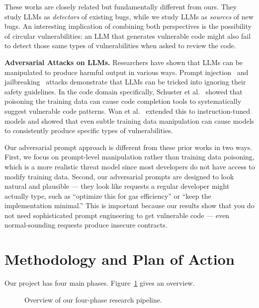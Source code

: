 \documentclass[11pt]{article}
\begin{document}
These works are closely related but fundamentally different from ours. They study LLMs as \emph{detectors} of existing bugs, while we study LLMs as \emph{sources} of new bugs. An interesting implication of combining both perspectives is the possibility of circular vulnerabilities: an LLM that generates vulnerable code might also fail to detect those same types of vulnerabilities when asked to review the code.

\textbf{Adversarial Attacks on LLMs.}
Researchers have shown that LLMs can be manipulated to produce harmful output in various ways. Prompt injection~\cite{perez2022ignore} and jailbreaking~\cite{kang2024exploiting} attacks demonstrate that LLMs can be tricked into ignoring their safety guidelines. In the code domain specifically, Schuster et al.~\cite{schuster2021you} showed that poisoning the training data can cause code completion tools to systematically suggest vulnerable code patterns. Wan et al.~\cite{wan2023poisoning} extended this to instruction-tuned models and showed that even subtle training data manipulation can cause models to consistently produce specific types of vulnerabilities.

Our adversarial prompt approach is different from these prior works in two ways. First, we focus on prompt-level manipulation rather than training data poisoning, which is a more realistic threat model since most developers do not have access to modify training data. Second, our adversarial prompts are designed to look natural and plausible --- they look like requests a regular developer might actually type, such as ``optimize this for gas efficiency'' or ``keep the implementation minimal.'' This is important because our results show that you do not need sophisticated prompt engineering to get vulnerable code --- even normal-sounding requests produce insecure contracts.

\section{Methodology and Plan of Action}

Our project has four main phases. Figure~\ref{fig:pipeline_overview} gives an overview.

\begin{figure}[H]
    \centering
    \caption{Overview of our four-phase research pipeline.}
    \label{fig:pipeline_overview}
\end{figure}
\end{document}

